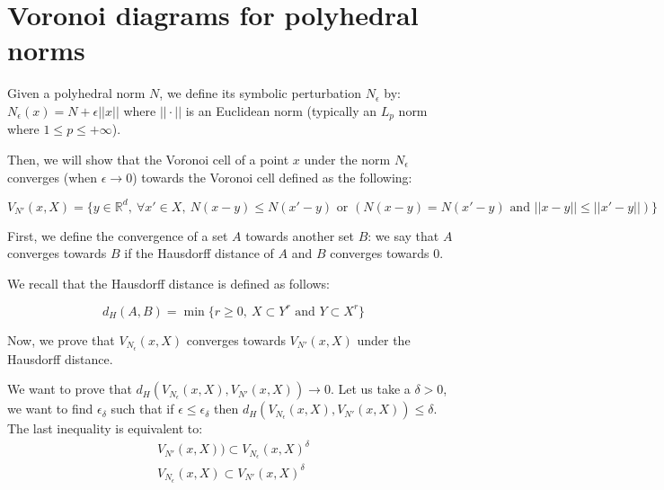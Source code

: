 \chapter{Voronoi diagrams for polyhedral norms}
\label{appendix:voronoi-polyhedral-norm}

Given a polyhedral norm $ N $, we define its symbolic perturbation $ N_\epsilon
$ by: $ N_\epsilon (x) = N + \epsilon || x || $ where $ || \cdot || $ is an
Euclidean norm (typically an $ L_p $ norm where $ 1 \leq p \leq +\infty $).

Then, we will show that the Voronoi cell of a point $ x $ under the norm $
N_\epsilon $ converges (when $ \epsilon \rightarrow 0 $) towards the Voronoi
cell defined as the following:

$$ V_{N'}(x, X) = \{ y \in \mathbb{R}^d,~\forall x' \in X,~N(x - y) \leq N(x'
-y) \text{ or } (N(x - y) = N(x' - y) \text { and } || x -y || \leq || x' - y ||) \} $$

First, we define the convergence of a set $ A $ towards another set $ B $: we
say that $ A $ converges towards $ B $ if the Hausdorff distance of $ A $ and $
B $ converges towards $ 0 $.

We recall that the Hausdorff distance is defined as follows:

$$ d_H(A, B) = \min \{ r \geq 0,~X \subset Y^r \text{ and } Y \subset X^r \} $$

Now, we prove that $ V_{N_\epsilon}(x, X) $ converges towards $ V_{N'}(x, X) $
under the Hausdorff distance.

We want to prove that $ d_H(V_{N_\epsilon}(x, X), V_{N'}(x, X)) \to 0 $.
Let us take a $ \delta > 0 $, we want to find $ \epsilon_\delta $ such that if $
\epsilon \leq \epsilon_\delta $ then $ d_H(V_{N_\epsilon}(x, X), V_{N'}(x, X))
\leq \delta $. The last inequality is equivalent to:
\begin{align}
    V_{N'}(x, X)) \subset V_{N_\epsilon}(x, X)^\delta \\
    V_{N_\epsilon}(x, X) \subset V_{N'}(x, X)^\delta
    \label{eqn:haussdorf-voronoi1}
\end{align}

